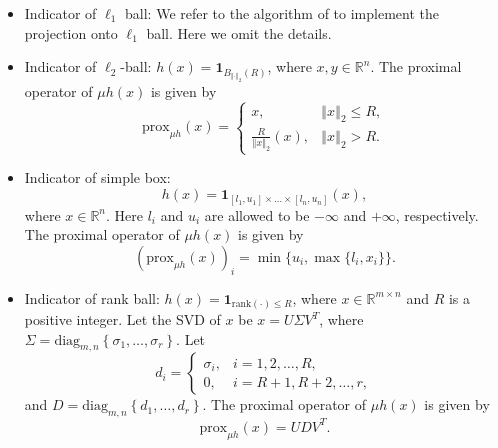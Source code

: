\documentclass[a4paper]{article}
\newcommand{\norm}[1]{\left\Vert#1\right\Vert}
\newcommand{\mr}{\mathbb{R}}
\newcommand{\prox}{\mathrm{prox}}
\newcommand{\mi}{\mathbf{1}}
\newcommand{\diag}{\mathrm{diag}}
\newcommand{\rank}{\mathrm{rank}}
\begin{document}
\begin{itemize}
    \item {Indicator of $\ell_1$ ball:} We refer to the algorithm of 
    \cite{l1ball} to implement the projection onto $\ell_1$ ball. 
  Here we omit the details. 
    
    \item {Indicator of $\ell_2$-ball:} $h(x) = 
    \mi_{ B_{\norm{\cdot}_2}(R)}$, where $x, y \in \mr^n$.
    The proximal operator of $\mu h(x)$ is given by
    \begin{displaymath}
      \prox_{\mu h}(x) = 
      \begin{cases}
        x, & \norm{x}_2 \le R, \\
        \frac{R}{\norm{x}_2}(x), & \norm{x}_2 > R.
      \end{cases}
    \end{displaymath}
    
    \item {Indicator of simple box:} $$h(x) = \mi_{[l_1,u_1] \times 
      \ldots \times [l_n,u_n]}(x),$$
    where $x \in \mr^n$. Here $l_i$ and $u_i$ are allowed to be 
    $-\infty$ and $+\infty$, respectively. The proximal operator of 
    $\mu h(x)$ is given by
    \begin{displaymath}
      (\prox_{\mu h}(x))_i = \min\{ u_i, \max\{l_i, x_i\} \}.
    \end{displaymath}
    
    \item {Indicator of rank ball:} $h(x) = \mi_{\rank(\cdot) \le 
      R}$, 
    where $x \in \mr^{m \times n}$ and $R$ is a positive integer. Let 
    the SVD of $x$ be $x = U \Sigma V^T$, where $\Sigma = 
    \diag_{m,n}\left\{ \sigma_1, \ldots, \sigma_r \right\}$. Let 
    \begin{displaymath}
      d_i = 
      \begin{cases}
        \sigma_i, & i = 1, 2, \ldots, R, \\
        0, & i = R+1, R+2, \ldots, r,
      \end{cases}
    \end{displaymath}
    and $D = \diag_{m,n}\left\{ d_1, \ldots, d_r \right\}$.
    The proximal operator of $\mu h(x)$ is given by
    \begin{displaymath}
      \prox_{\mu h}(x) = U D V^T.
    \end{displaymath}
    
  \end{itemize}
  
  
  
  
  
\end{document}
